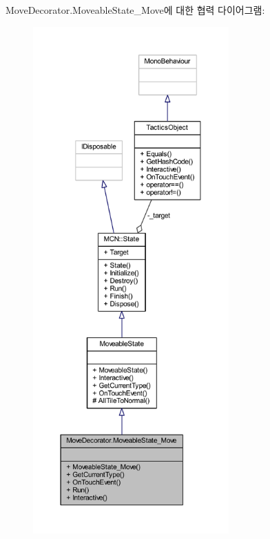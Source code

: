Move\+Decorator.\+Moveable\+State\+\_\+\+Move에 대한 협력 다이어그램\+:
\nopagebreak
\begin{figure}[H]
\begin{center}
\leavevmode
\includegraphics[height=550pt]{class_move_decorator_1_1_moveable_state___move__coll__graph}
\end{center}
\end{figure}

